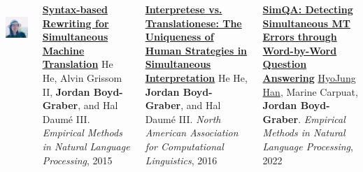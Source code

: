 \documentclass[compress]{beamer}
\begin{document}
\begin{frame}{}
\begin{columns}
\begin{center}
        \\
        \includegraphics[width=0.8\linewidth]{general_figures/hyojung}
        \end{center}

        \begin{block}{ {\bf
              \href{http://umiacs.umd.edu/~jbg//docs/2015_emnlp_rewrite.pdf}{Syntax-based
                Rewriting for Simultaneous Machine Translation}}}
          \small
He He, Alvin Grissom II, {\bf Jordan Boyd-Graber}, and Hal {Daum\'{e} III}.  \emph{Empirical Methods in Natural Language Processing}, 2015
        \end{block}

        \begin{block}{ {\bf
              \href{http://umiacs.umd.edu/~jbg/docs/2016_naacl_interpretese.pdf}{Interpretese
                vs. Translationese: The Uniqueness of Human Strategies
                in Simultaneous Interpretation}}}
          \small
He He, {\bf Jordan Boyd-Graber}, and Hal {Daum\'{e} III}.
\emph{North American Association for Computational Linguistics}, 2016
        \end{block}


        \begin{block}{ {\bf
              \href{http://umiacs.umd.edu/~jbg/docs/2022_emnlp_simint.pdf}{SimQA:
                Detecting Simultaneous MT Errors through 
                Word-by-Word Question Answering}}}
          \small
          \href{https://h-j-han.github.io/}{HyoJung Han}, Marine
            Carpuat, {\bf Jordan Boyd-Graber}.  \emph{Empirical Methods in Natural Language Processing}, 2022
          
          \end{block}
  \end{columns}


\end{frame}
\end{document}
